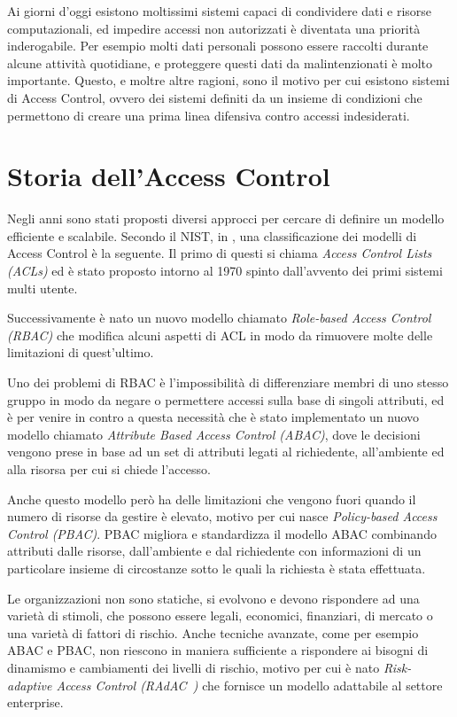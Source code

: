 \newcommand{\radac}{RAdAC\ }
\label{cap:accessControl}
Ai giorni d'oggi esistono moltissimi sistemi capaci di condividere dati e risorse computazionali, 
ed impedire accessi non autorizzati è diventata una priorità inderogabile.
Per esempio molti dati personali possono essere raccolti durante alcune attività quotidiane, e proteggere questi dati
da malintenzionati è molto importante.
Questo, e moltre altre ragioni, sono il motivo per cui esistono sistemi di Access Control, ovvero dei sistemi definiti da un insieme di condizioni 
che permettono di creare una prima linea difensiva contro accessi indesiderati.
\section{Storia dell'Access Control}
\label{sec:history}
Negli anni sono stati proposti diversi approcci per cercare di definire un modello efficiente e scalabile. Secondo il NIST, in \cite{NISTACM}, una classificazione dei modelli di Access Control è la seguente. 
Il primo di questi si chiama \textit{Access Control Lists (ACLs)} ed è stato proposto intorno al 1970 spinto dall'avvento dei primi sistemi multi utente.\\ \par
Successivamente è nato un nuovo modello chiamato \textit{Role-based Access Control (RBAC)} che modifica alcuni aspetti di ACL  in modo da rimuovere molte delle limitazioni di quest'ultimo.\\ \par
Uno dei problemi di RBAC è l'impossibilità di differenziare membri di uno stesso gruppo in modo da negare o permettere accessi sulla base di singoli attributi, ed è per venire in contro a questa necessità che è stato implementato un nuovo modello chiamato \textit{Attribute Based Access Control (ABAC)}, dove le decisioni vengono prese in base ad un set di attributi legati al richiedente, all'ambiente ed alla risorsa per cui si chiede l'accesso.\\ \par
Anche questo modello però ha delle limitazioni che vengono fuori quando il numero di risorse da gestire è elevato, motivo per cui nasce \textit{Policy-based Access Control (PBAC)}.
PBAC migliora e standardizza il modello ABAC combinando attributi dalle risorse, dall'ambiente e dal richiedente con informazioni di un particolare insieme di circostanze sotto le quali la richiesta è stata effettuata.\\ \par
Le organizzazioni non sono statiche, si evolvono e devono rispondere ad una varietà di stimoli, che possono essere legali, economici, finanziari, di mercato o una varietà di fattori di rischio.
Anche tecniche avanzate, come per esempio ABAC e PBAC, non riescono in maniera sufficiente a rispondere ai bisogni di dinamismo e cambiamenti dei livelli di rischio, motivo per cui è nato \textit{Risk-adaptive Access Control (\radac)} che fornisce un modello adattabile al settore enterprise.

